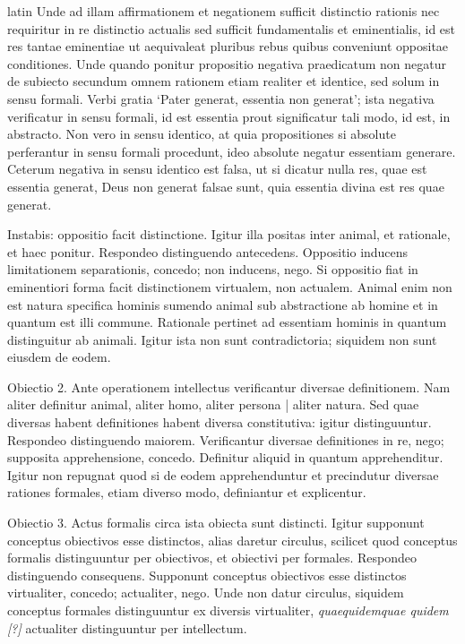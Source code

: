 \begin{otherlanguage*}{latin}
\pstart
Unde ad illam affirmationem et negationem sufficit distinctio rationis nec requiritur in re distinctio actualis sed sufficit fundamentalis et eminentialis, id est res tantae eminentiae ut aequivaleat pluribus rebus quibus conveniunt oppositae conditiones. Unde quando ponitur propositio negativa  praedicatum non negatur de subiecto secundum omnem rationem etiam realiter et identice, sed solum in sensu formali. Verbi gratia `Pater generat, essentia non generat'; ista negativa verificatur in sensu formali, id est essentia prout significatur tali modo, id est, in abstracto. Non vero in sensu identico, at quia propositiones si absolute perferantur in sensu formali procedunt, ideo absolute negatur essentiam generare. Ceterum negativa in sensu identico est falsa, ut si dicatur nulla res, quae est essentia generat, Deus non generat falsae sunt, quia essentia divina est res quae generat. 
\pend

\pstart
Instabis:
oppositio facit distinctione. Igitur illa positas inter animal, et rationale, et haec ponitur. Respondeo distinguendo antecedens. Oppositio inducens limitationem separationis, concedo; non inducens, nego. Si oppositio fiat in eminentiori forma facit distinctionem virtualem, non actualem. Animal enim non est natura specifica hominis sumendo animal sub abstractione ab homine et in quantum est illi commune. Rationale pertinet ad essentiam hominis in quantum distinguitur ab animali. Igitur ista non sunt contradictoria; siquidem non sunt eiusdem de eodem. 
\pend

\pstart
Obiectio 2. Ante operationem intellectus verificantur diversae definitionem. Nam aliter definitur animal, aliter homo, aliter persona \textnormal{|} aliter natura. Sed quae diversas habent definitiones habent diversa constitutiva:
igitur distinguuntur. Respondeo distinguendo maiorem. Verificantur diversae definitiones in re, nego; supposita apprehensione, concedo. Definitur aliquid in quantum apprehenditur. Igitur non repugnat quod si de eodem apprehenduntur et precindutur diversae rationes formales, etiam diverso modo, definiantur et explicentur. 
\pend

\pstart
Obiectio 3. Actus formalis circa ista obiecta sunt distincti. Igitur supponunt conceptus obiectivos esse distinctos, alias daretur circulus, scilicet quod conceptus formalis distinguuntur per obiectivos, et obiectivi per formales. Respondeo distinguendo consequens. Supponunt conceptus obiectivos esse distinctos virtualiter, concedo; actualiter, nego. Unde non datur circulus, siquidem conceptus formales distinguuntur ex diversis virtualiter, \emph{quaequidemquae quidem [?]} actualiter distinguuntur per intellectum. 
\pend


\end{otherlanguage*}
